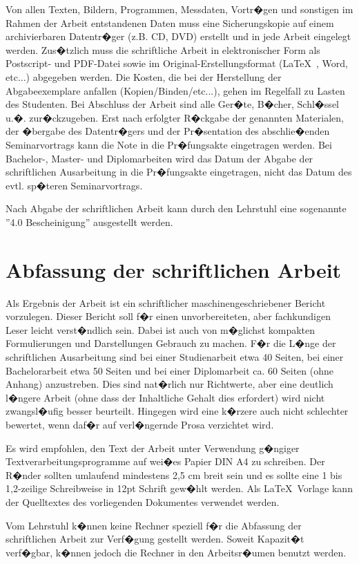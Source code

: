 Von allen Texten, Bildern, Programmen, Messdaten, Vortr�gen und sonstigen im Rahmen der Arbeit entstandenen Daten muss eine Sicherungskopie auf einem
archivierbaren Datentr�ger (z.B. CD, DVD) erstellt und in jede Arbeit eingelegt
werden. Zus�tzlich muss die schriftliche Arbeit in elektronischer Form als Postscript- und
PDF-Datei sowie im Original-Erstellungsformat (\LaTeX\ , Word, etc...) abgegeben werden. Die Kosten, die bei der Herstellung der Abgabeexemplare anfallen (Kopien/Binden/etc...), gehen im Regelfall zu Lasten des Studenten. Bei Abschluss der Arbeit sind alle Ger�te, B�cher, Schl�ssel u.�. zur�ckzugeben. Erst nach erfolgter R�ckgabe der genannten Materialen, der �bergabe des Datentr�gers und der Pr�sentation des abschlie�enden Seminarvortrags kann die Note in die Pr�fungsakte eingetragen werden. Bei Bachelor-, Master- und Diplomarbeiten wird das Datum der Abgabe der schriftlichen Ausarbeitung in die Pr�fungsakte eingetragen, nicht das Datum des evtl. sp�teren Seminarvortrags.

Nach Abgabe der schriftlichen Arbeit kann durch den Lehrstuhl eine sogenannte ''4.0 Bescheinigung'' ausgestellt werden.


\chapter{Abfassung der schriftlichen Arbeit}
Als Ergebnis der Arbeit ist ein schriftlicher maschinengeschriebener Bericht
vorzulegen. Dieser Bericht soll f�r einen unvorbereiteten, aber fachkundigen Leser leicht
verst�ndlich sein. Dabei ist auch von m�glichst kompakten Formulierungen und Darstellungen Gebrauch
zu machen. F�r die L�nge der schriftlichen Ausarbeitung sind bei einer Studienarbeit etwa 40
Seiten, bei einer Bachelorarbeit etwa 50 Seiten und bei einer Diplomarbeit ca. 60 Seiten (ohne Anhang)
anzustreben. Dies sind nat�rlich nur Richtwerte, aber eine deutlich l�ngere Arbeit (ohne dass der Inhaltliche
Gehalt dies erfordert) wird nicht zwangsl�ufig besser beurteilt. Hingegen wird eine k�rzere auch nicht schlechter
bewertet, wenn daf�r auf verl�ngernde Prosa verzichtet wird.

Es wird empfohlen, den Text der Arbeit unter Verwendung g�ngiger Textverarbeitungsprogramme auf
wei�es Papier DIN A4 zu schreiben. Der R�nder sollten umlaufend mindestens 2,5 cm breit sein und es
sollte eine 1 bis 1,2-zeilige Schreibweise in 12pt Schrift gew�hlt werden. Als \LaTeX\ Vorlage kann der Quelltextes des vorliegenden Dokumentes verwendet werden.

Vom Lehrstuhl k�nnen keine Rechner speziell f�r die Abfassung der schriftlichen Arbeit zur
Verf�gung gestellt werden. Soweit Kapazit�t verf�gbar, k�nnen jedoch die Rechner in den
Arbeitsr�umen benutzt werden.
\clearpage



